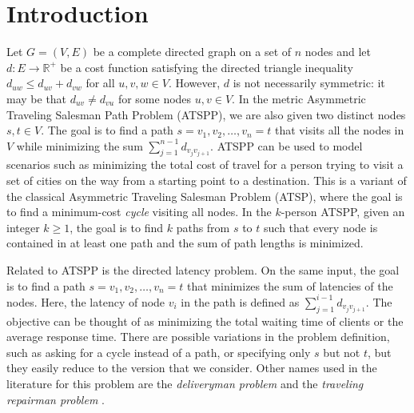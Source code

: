 \documentclass[11pt]{article}
\begin{document}
\section{Introduction}
Let $G=(V,E)$ be a complete directed graph on a set of $n$ nodes and let 
$d : E \rightarrow \mathbb R^+$ be a cost function
satisfying the directed triangle inequality $d_{uw} \leq d_{uv} + d_{vw}$ for
all $u,v,w \in V$.  However, $d$ is not necessarily symmetric: it may be that
$d_{uv} \neq d_{vu}$ for some nodes $u,v \in V$.
In the metric Asymmetric Traveling Salesman Path Problem (ATSPP), we are also given
two distinct nodes $s,t \in V$.  The goal is to find a path
${s = v_1}, v_2, \ldots, {v_n = t}$
that visits all the nodes in $V$ while minimizing the sum $\sum_{j=1}^{n-1} d_{v_j v_{j+1}}$.
ATSPP can be used to model scenarios such as minimizing the total cost of travel
for a person trying to visit a set of cities on the way from a starting point to a destination. 
This is a variant of the classical Asymmetric Traveling Salesman Problem (ATSP), where the goal is to find a minimum-cost \emph{cycle} visiting all nodes.
In the $k$-person ATSPP, given an integer $k\geq 1$, the goal is to find $k$ paths from $s$ to $t$ such that every node is contained in at least one path and the sum of path lengths is minimized.


Related to ATSPP is the directed latency problem.  
On the same input, the goal is to find a 
path ${s = v_1}, v_2, \ldots, {v_n = t}$ that minimizes the sum of latencies of the nodes.  Here, the latency of node $v_i$ in the path
is defined as $\sum_{j = 1}^{i-1} d_{v_jv_{j+1}}$.
The objective can be thought of as minimizing the total waiting time of clients or
the average response time.
There are possible variations in the problem definition, such as asking for a cycle instead of a path, or specifying only $s$ but not $t$, but they easily reduce to the version that we consider. 
Other names used in the literature for this problem are the {\em deliveryman problem}
\cite{minieka} and the {\em traveling repairman problem} \cite{afrati}.
\end{document}
